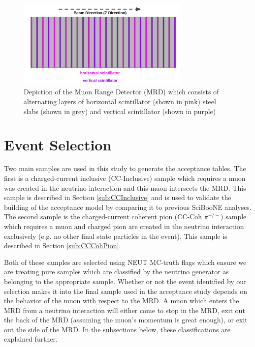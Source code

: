 \documentclass[11pt]{article}
\begin{document}
\begin{figure}[H]
\centering
\includegraphics[width=0.75\textwidth]{EventClassifications/mrd.png}
\caption{Depiction of the Muon Range Detector (MRD) which consists of alternating layers of horizontal scintillator (shown in pink) steel slabs (shown in grey) and vertical scintillator (shown in purple)}
\label{fig:mrddetector}
\end{figure}



\section{Event Selection}
\label{sec:eventselection}
Two main samples are used in this study to generate the acceptance tables. The first is a charged-current inclusive (CC-Inclusive) sample which requires a muon was created in the neutrino interaction and this muon intersects the MRD. This sample is described in Section \ref*{sub:CCInclusive} and is used to validate the building of the acceptance model by comparing it to previous SciBooNE analyses. The second sample is the charged-current coherent pion (CC-Coh $\pi^{+/-}$) sample which requires a muon and charged pion are created in the neutrino interaction exclusively (e.g. no other final state particles in the event). This sample is described in Section \ref*{sub:CCCohPion}.

Both of these samples are selected using NEUT MC-truth flags which ensure we are treating pure samples which are classified by the neutrino generator as belonging to the appropriate sample. Whether or not the event identified by our selection makes it into the final sample used in the acceptance study depends on the behavior of the muon with respect to the MRD. A muon which enters the MRD from a neutrino interaction will either come to stop in the MRD, exit out the back of the MRD (assuming the muon's momentum is great enough), or exit out the side of the MRD. In the subsections below, these classifications are explained further.
\end{document}
